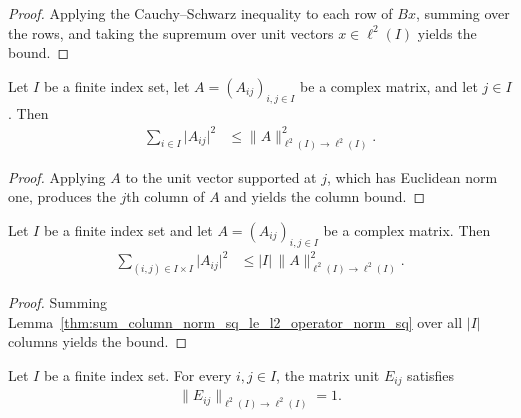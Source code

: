 \begin{proof}
    \leanok
    Applying the Cauchy--Schwarz inequality to each row of $Bx$, summing over
    the rows, and taking the supremum over unit vectors $x\in\ell^2(I)$ yields
    the bound.
\end{proof}

\begin{lemma}
    \label{thm:sum_column_norm_sq_le_l2_operator_norm_sq}
    \leanok
    Let $I$ be a finite index set, let $A=(A_{ij})_{i,j\in I}$ be a complex
    matrix, and let $j\in I$.  Then
    \begin{align}
        \sum_{i\in I}\lvert A_{ij}\rvert^2
         & \leq \lVert A\rVert_{\ell^2(I)\to\ell^2(I)}^2.
        \label{eq:sum_column_norm_sq_le_l2_operator_norm_sq}
    \end{align}
\end{lemma}

\begin{proof}
    \leanok
    Applying $A$ to the unit vector supported at $j$, which has Euclidean norm
    one, produces the $j$th column of $A$ and yields the column bound.
\end{proof}

\begin{lemma}
    \label{thm:sum_entry_norm_sq_le_card_mul_l2_operator_norm_sq}
    \leanok
    Let $I$ be a finite index set and let $A=(A_{ij})_{i,j\in I}$ be a complex
    matrix.  Then
    \begin{align}
        \sum_{(i,j)\in I\times I}\lvert A_{ij}\rvert^2
         & \leq |I|\,
        \lVert A\rVert_{\ell^2(I)\to\ell^2(I)}^2.
        \label{eq:sum_entry_norm_sq_le_card_mul_l2_operator_norm_sq}
    \end{align}
\end{lemma}

\begin{proof}
    \leanok
    Summing Lemma~\ref{thm:sum_column_norm_sq_le_l2_operator_norm_sq} over
    all $|I|$ columns yields the bound.
\end{proof}

\begin{lemma}
    \label{thm:l2_operator_norm_matrix_unit}
    \leanok
    Let $I$ be a finite index set.  For every $i,j\in I$, the matrix unit
    $E_{ij}$ satisfies
    \begin{align}
        \lVert E_{ij}\rVert_{\ell^2(I)\to\ell^2(I)}=1.
        \label{eq:l2_operator_norm_matrix_unit}
    \end{align}
\end{lemma}

